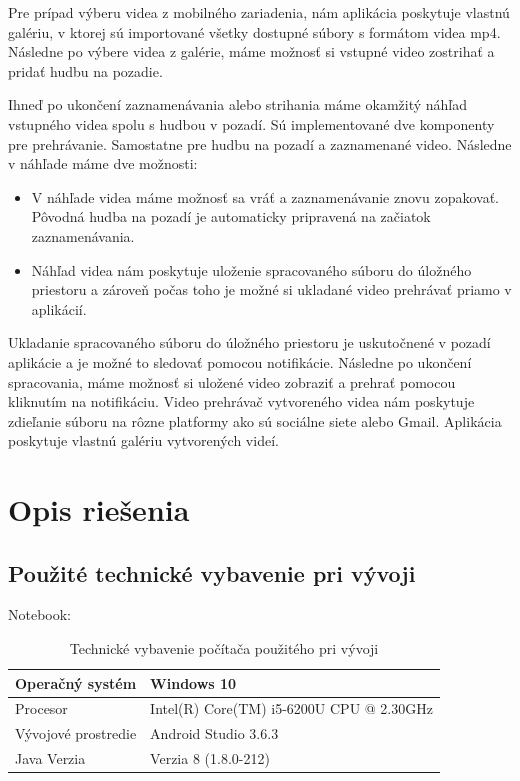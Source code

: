 \documentclass[12pt, oneside]{book}
\begin{document}
Pre prípad výberu videa z mobilného zariadenia, nám aplikácia poskytuje vlastnú galériu, v ktorej sú importované všetky dostupné súbory s formátom videa mp4. Následne po výbere videa z galérie, máme možnosť si vstupné video zostrihať a pridať hudbu na pozadie.

Ihneď po ukončení zaznamenávania alebo strihania máme okamžitý náhľad vstupného videa spolu s hudbou v pozadí. Sú implementované dve  komponenty pre prehrávanie. Samostatne pre hudbu na pozadí a zaznamenané video. Následne v náhľade máme dve možnosti:
\begin{itemize}
    \item V náhľade videa máme možnosť sa vráť a zaznamenávanie znovu zopakovať. Pôvodná hudba na pozadí je automaticky pripravená na začiatok zaznamenávania.
    \item Náhľad videa nám poskytuje uloženie spracovaného súboru do úložného priestoru a zároveň počas toho je možné si ukladané video prehrávať priamo v aplikácií.
\end{itemize}

Ukladanie spracovaného súboru do úložného priestoru je uskutočnené v pozadí aplikácie a je možné to sledovať pomocou notifikácie. Následne po ukončení spracovania, máme možnosť si uložené video zobraziť a prehrať pomocou kliknutím na notifikáciu. Video prehrávač vytvoreného videa nám poskytuje zdieľanie súboru na rôzne platformy ako sú sociálne siete alebo Gmail.
Aplikácia poskytuje vlastnú galériu vytvorených videí.

\newpage

\chapter{Opis riešenia}

\section{Použité technické vybavenie pri vývoji}

\begin{table}[H]

Notebook:

\begin{center}
\begin{tabularx}{0.8\textwidth} { 
  | >{\raggedright\arraybackslash}X 
  | >{\raggedright\arraybackslash}X | }
  \hline
 Operačný systém & Windows 10 \\
 \hline
 Procesor & Intel(R) Core(TM) i5-6200U CPU @ 2.30GHz \\
 \hline
 Vývojové prostredie  & Android Studio 3.6.3  \\
  \hline
 Java Verzia  & Verzia 8 (1.8.0-212)  \\
\hline
\end{tabularx}
\caption{Technické vybavenie počítača použitého pri vývoji}
\end{center}
\end{table}
\end{document}
